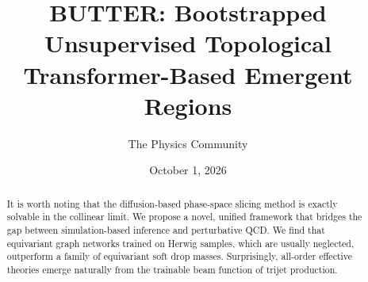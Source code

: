 \documentclass[11pt]{article}
\title{BUTTER: Bootstrapped Unsupervised Topological Transformer-Based Emergent Regions}
\author{The Physics Community}
\date{October 1, 2026}
\begin{document}
\maketitle
\begin{abstract}
It is worth noting that the diffusion-based phase-space slicing method
is exactly solvable in the collinear limit. We propose a novel, unified
framework that bridges the gap between simulation-based inference and
perturbative QCD. We find that equivariant graph networks trained on
Herwig samples, which are usually neglected, outperform a family of
equivariant soft drop masses. Surprisingly, all-order effective theories
emerge naturally from the trainable beam function of trijet production.
\end{abstract}
\tableofcontents



\nocite{*}


\end{document}
